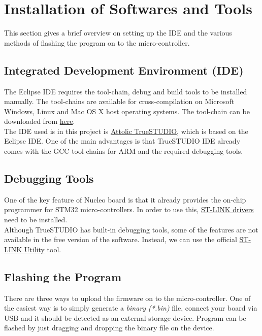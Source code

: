 \documentclass[a4paper,12pt,oneside]{book}
\begin{document}
\section{Installation of Softwares and Tools}
This section gives a brief overview on setting up the IDE and the various methods of flashing the program on to the micro-controller.

\subsection{Integrated Development Environment (IDE)}
The Eclipse IDE requires the tool-chain, debug and build tools to be installed manually. The tool-chains are available for cross-compilation on Microsoft Windows, Linux and Mac OS X host operating systems. The tool-chain can be downloaded from \href{https://launchpad.net/gcc-arm-embedded/}{here}.\cite{gnu}\\

The IDE used is in this project is \href{https://atollic.com/resources/download/}{Attolic TrueSTUDIO}, which is based on the Eclipse IDE. One of the main advantages is that TrueSTUDIO IDE already comes with the GCC tool-chains for ARM and the required debugging tools.\\ 

\subsection{Debugging Tools}
One of the key feature of Nucleo board is that it already provides the on-chip programmer for STM32 micro-controllers. In order to use this, \href{http://www.st.com/en/embedded-software/stsw-link009.html}{ST-LINK drivers} need to be installed.\\

Although TrueSTUDIO has built-in debugging tools, some of the features are not available in the free version of the software. Instead, we can use the official \href{http://www.st.com/en/embedded-software/stsw-link004.html}{ST-LINK Utility} tool.\\

\subsection{Flashing the Program}
There are three ways to upload the firmware on to the micro-controller. One of the easiest way is to simply generate a \textit{binary (*.bin)} file, connect your board via USB and it should be detected as an external storage device. Program can be flashed by just dragging and dropping the binary file on the device.\\
\end{document}
